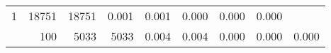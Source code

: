 \begin{table}
\begin{tabular}{rrrrrrrrr}
					\multirow{ 1 }{*}{ 1 } &
					
						
							    
							     18751  & 18751  
	                           & 0.001 & 0.001 & 0.000
	                           & 0.000 & 0.000  \\
	                
	            
	        
				\noalign{\smallskip}\hline
				\multirow{ 1 }{*}{ 1000000 } &
				
					
					 
					\multirow{ 1 }{*}{ 100 } &
					
						
							    
							     5033  & 5033  
	                           & 0.004 & 0.004 & 0.000
	                           & 0.000 & 0.000  \\
	                
	            
	        

\hline

\end{tabular}
\end{table}
\clearpage


	    

